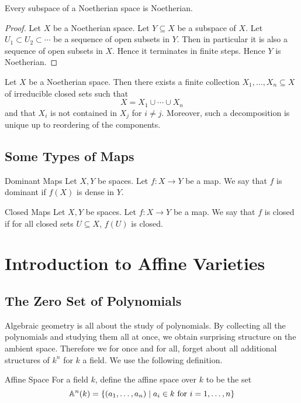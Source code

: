 \documentclass[a4paper]{article}
\begin{document}
\begin{prp}{}{} Every subspace of a Noetherian space is Noetherian. \tcbline
\begin{proof}
Let $X$ be a Noetherian space. Let $Y\subseteq X$ be a subspace of $X$. Let $U_1\subset U_2\subset\cdots$ be a sequence of open subsets in $Y$. Then in particular it is also a sequence of open subsets in $X$. Hence it terminates in finite steps. Hence $Y$ is Noetherian. 
\end{proof}
\end{prp}

\begin{prp}{}{} Let $X$ be a Noetherian space. Then there exists a finite collection $X_1,\dots,X_n\subseteq X$ of irreducible closed sets such that $$X=X_1\cup\cdots\cup X_n$$ and that $X_i$ is not contained in $X_j$ for $i\neq j$. Moreover, such a decomposition is unique up to reordering of the components. 
\end{prp}

\subsection{Some Types of Maps}
\begin{defn}{Dominant Maps}{} Let $X,Y$ be spaces. Let $f:X\to Y$ be a map. We say that $f$ is dominant if $f(X)$ is dense in $Y$. 
\end{defn}

\begin{defn}{Closed Maps}{} Let $X,Y$ be spaces. Let $f:X\to Y$ be a map. We say that $f$ is closed if for all closed sets $U\subseteq X$, $f(U)$ is closed. 
\end{defn}

\pagebreak
\section{Introduction to Affine Varieties}
\subsection{The Zero Set of Polynomials}
Algebraic geometry is all about the study of polynomials. By collecting all the polynomials and studying them all at once, we obtain surprising structure on the ambient space. Therefore we for once and for all, forget about all additional structures of $k^n$ for $k$ a field. We use the following definition. 

\begin{defn}{Affine Space}{} For a field $k$, define the affine space over $k$ to be the set $$\mathbb{A}^n(k)=\{(a_1,\dots,a_n)\;|\;a_i\in k\text{ for }i=1,\dots,n\}$$
\end{defn}
\end{document}
